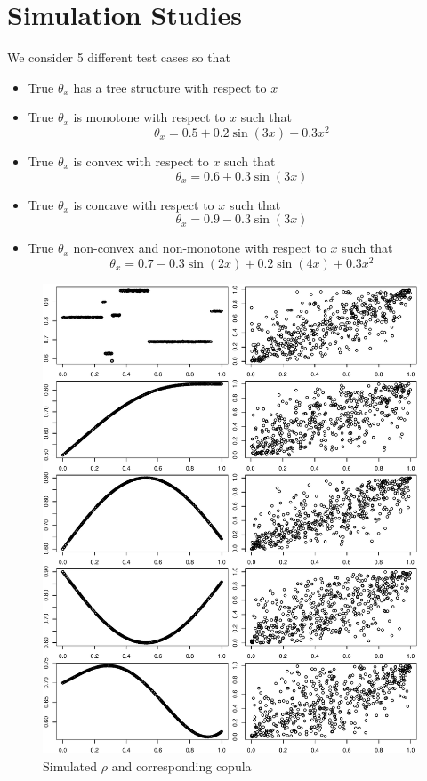 \documentclass{amsart}
\begin{document}
\section{Simulation Studies}

We consider 5 different test cases so that
\begin{itemize}
    \item True $\theta_x$ has a tree structure with respect to $x$
    \item True $\theta_x$ is monotone with respect to $x$ such that 
    \begin{equation}
        \theta_x = 0.5 + 0.2 \sin(3x) + 0.3x^2
    \end{equation}
    \item True $\theta_x$ is convex with respect to $x$ such that 
    \begin{equation}
        \theta_x = 0.6 + 0.3 \sin(3x)
    \end{equation}
    \item True $\theta_x$ is concave with respect to $x$ such that 
    \begin{equation}
        \theta_x = 0.9 - 0.3 \sin(3x)
    \end{equation}
    \item True $\theta_x$ non-convex and non-monotone with respect to $x$ such that 
    \begin{equation}
        \theta_x = 0.7 - 0.3 \sin(2x) + 0.2 \sin(4x) + 0.3 x^2
    \end{equation}
\end{itemize}

\begin{figure}[ht]
    \centering
    \includegraphics[width=0.95\linewidth]{true_rho_copula.pdf}
    \caption{Simulated $\rho$ and corresponding copula}
    \label{fig:sim-dat}
\end{figure}
\end{document}
